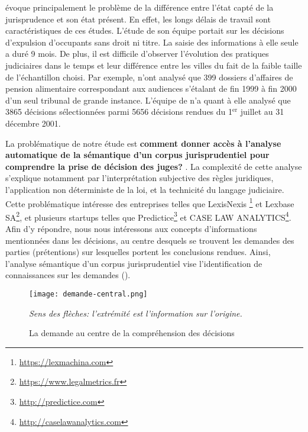 \citet{ancel2003expulsion} évoque principalement le problème de la différence entre l'état capté de la jurisprudence et son état présent. En effet, les longs délais de travail sont caractéristiques de ces études. L'étude de son équipe portait sur les décisions d'expulsion d'occupants sans droit ni titre. La saisie des informations à elle seule a duré 9 mois.  De plus, il est difficile d'observer l'évolution des pratiques judiciaires dans le temps et leur différence entre les villes du fait de la faible taille de l'échantillon choisi. Par exemple, \citet{jeandidier2006pensions} n'ont analysé que 399 dossiers d'affaires de pension alimentaire correspondant aux audiences s'étalant de fin 1999 à fin 2000 d'un seul tribunal de grande instance. L'équipe de \citet{ancel2003expulsion} n'a quant à elle analysé que 3865 décisions sélectionnées parmi 5656 décisions rendues du 1$^\text{er}$  juillet au 31 décembre 2001. 
 
La problématique de notre étude est \og \textbf{comment donner accès à l'analyse automatique de la sémantique d'un corpus jurisprudentiel pour comprendre la prise de décision des juges?} \fg{}. La complexité de cette analyse s'explique notamment par l'interprétation subjective des règles juridiques, l'application non déterministe de la loi, et la technicité du langage judiciaire. Cette problématique intéresse des entreprises telles que LexisNexis \footnote{\url{https://lexmachina.com}} et Lexbase SA\footnote{\url{https://www.legalmetrics.fr}}, et plusieurs startups  telles que Predictice\footnote{\url{http://predictice.com}} et CASE LAW ANALYTICS\footnote{\url{http://caselawanalytics.com}}. Afin d'y répondre, nous nous intéressons aux concepts d'informations mentionnées dans les décisions, au centre desquels se trouvent les demandes des parties (prétentions) sur lesquelles portent les conclusions rendues. Ainsi, l'analyse sémantique d'un corpus jurisprudentiel vise l'identification de connaissances sur les demandes ().
 \begin{figure}[!htb]
 	\centering
 	\texttt{[image: demande-central.png]}
 	
 	\scriptsize{\textit{Sens des flèches: l'extrémité est l'information sur l'origine.}}
 	\caption{La demande au centre de la compréhension des décisions}
 	\label{fig:intro:demande-central}
 \end{figure} 

